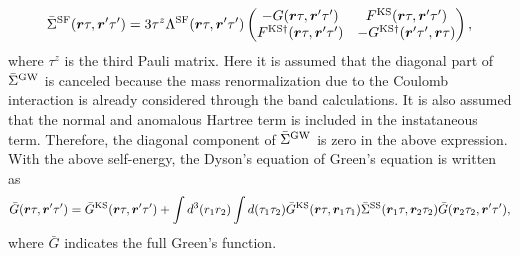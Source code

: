 %
\begin{equation}
	\bar{\Sigma}^{\rm SF}(\bm r \tau, \bm r' \tau') = 3\tau^z 
	\Lambda^{\rm SF}(\bm r \tau, \bm r' \tau')
	\begin{pmatrix}
		-G(\bm r \tau, \bm r' \tau')  &   F^{\rm KS}(\bm r \tau, \bm r' \tau')   \\
		F^{\rm KS\dag}(\bm r \tau, \bm r' \tau')  & -G^{\rm KS\dag}(\bm r' \tau', \bm r \tau)
	\end{pmatrix},
	\label{eq:SFself}
\end{equation}
%
where $\tau^z$ is the third Pauli matrix. 
Here it is assumed that the diagonal part of $\bar{\Sigma}^{\rm GW}$ is canceled
because the mass renormalization due to the Coulomb interaction is already considered through the
band calculations. It is also assumed that the normal and anomalous Hartree term is included in the instataneous term.
Therefore, the diagonal component of $\bar{\Sigma}^{\rm GW}$ is zero in the above expression. 
With the above self-energy, the Dyson's equation of Green's equation is written as 
%
\begin{equation}
	\bar{G}(\bm r \tau, \bm r' \tau') = \bar{G}^{\rm KS}(\bm r \tau, \bm r' \tau') +
	\int d^{3}(r_1 r_2)\int d(\tau_1 \tau_2)\bar{G}^{\rm KS}(\bm r \tau, \bm r_1 \tau_1)
	\bar{\Sigma}^{\rm SS}(\bm r_1 \tau, \bm r_2 \tau_2)\bar{G}(\bm r_2 \tau_2, \bm r' \tau'),
	\label{eq:GDysoneq}
\end{equation}
%
where $\bar{G}$ indicates the full Green's function. 

